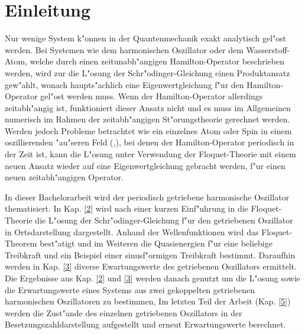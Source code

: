 \chapter{Einleitung}
\iffalse
Hier folgt eine kurze Einleitung in die Thematik der Bachelorarbeit.
Die Einleitung muss kurz sein, damit die vorgegebene Gesamtlänge der
Arbeit von 25 Seiten nicht überschritten wird.
Die Beschränkung der Seitenzahl sollte man ernst nehmen,
da Überschreitung zu Abzügen in der Note führen kann.
Um der Längenbeschränkung zu genügen, darf auch nicht an der Schriftgröße,
dem Zeilenabstand oder dem Satzspiegel (bedruckte Fläche der Seite) manipuliert werden.



nur wenige systeme exakt loesbar in qm harm oszi, wasserstoff. bei zeitabh hamiltonop keine stat schroed glgl  (eigenwertglg), gelingt aber bei periodischen mit floqet thoerie
\fi

Nur wenige System k"onnen in der Quantenmechanik exakt analytisch gel"ost werden.
Bei Systemen wie dem harmonischen Oszillator oder dem Wasserstoff-Atom, welche durch einen zeitunabh"angigen Hamilton-Operator beschrieben werden, wird zur die L"osung der Schr"odinger-Gleichung einen Produktansatz gew"ahlt, wonach haupts"achlich eine Eigenwertgleichung f"ur den Hamilton-Operator gel"ost werden muss.
Wenn der Hamilton-Operator allerdings zeitabh"angig ist, funktioniert dieser Ansatz nicht und es muss im Allgemeinen numerisch im Rahmen der zeitabh"angigen St"orungstheorie gerechnet werden.
Werden jedoch Probleme betrachtet wie ein einzelnes Atom oder Spin in einem oszillierenden "au"seren Feld (\cite{haengi},\cite{sherly}), bei denen der Hamilton-Operator periodisch in der Zeit ist, kann die L"osung unter Verwendung der Floquet-Theorie mit einem neuen Ansatz wieder auf eine Eigenwertgleichung gebracht werden, f"ur einen neuen zeitabh"angigen Operator.

In dieser Bachelorarbeit wird der periodisch getriebene harmonische Oszillator thematisiert.
In Kap. \ref{2} wird nach einer kurzen Einf"uhrung in die Floquet-Theorie die L"osung der Schr"odinger-Gleichung f"ur den getriebenen Oszillator in Ortsdarstellung dargestellt.
Anhand der Wellenfunktionen wird das Floquet-Theorem best"atigt und im Weiteren die Quasienergien f"ur eine beliebige Treibkraft und ein Beispiel einer sinusf"ormigen Treibkraft bestimmt.
Daraufhin werden in Kap. \ref{3} diverse Ewartungswerte des getriebenen Oszillators ermittelt.
Die Ergebnisse aus Kap. \ref{2} und \ref{3} werden danach genutzt um die L"osung sowie die Erwartungswerte eines Systems aus zwei gekoppelten getriebenen harmonischen Oszillatoren zu bestimmen,
Im letzten Teil der Arbeit (Kap. \ref{5}) werden die Zust"ande des einzelnen getriebenen Oszillators in der Besetzungszahldarstellung aufgestellt und erneut Erwartungswerte berechnet.
